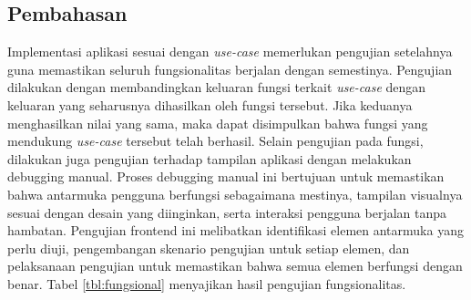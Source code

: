\subsection{Pembahasan}
Implementasi aplikasi sesuai dengan \emph{use-case} memerlukan pengujian setelahnya guna memastikan seluruh fungsionalitas berjalan dengan semestinya. Pengujian dilakukan dengan membandingkan keluaran fungsi terkait \emph{use-case} dengan keluaran yang seharusnya dihasilkan oleh fungsi tersebut. Jika keduanya menghasilkan nilai yang sama, maka dapat disimpulkan bahwa fungsi yang mendukung \emph{use-case} tersebut telah berhasil. Selain pengujian pada fungsi, dilakukan juga pengujian terhadap tampilan aplikasi dengan melakukan debugging manual. Proses debugging manual ini bertujuan untuk memastikan bahwa antarmuka pengguna berfungsi sebagaimana mestinya, tampilan visualnya sesuai dengan desain yang diinginkan, serta interaksi pengguna berjalan tanpa hambatan. Pengujian frontend ini melibatkan identifikasi elemen antarmuka yang perlu diuji, pengembangan skenario pengujian untuk setiap elemen, dan pelaksanaan pengujian untuk memastikan bahwa semua elemen berfungsi dengan benar. Tabel \ref{tbl:fungsional} menyajikan hasil pengujian fungsionalitas.

